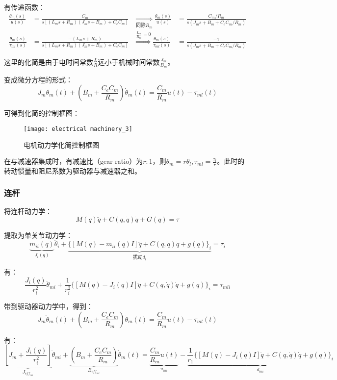 \documentclass[
12pt, %
a4paper, 
oneside, %
headinclude,footinclude, %
]{scrartcl}
\begin{document}
有传递函数：
\begin{align*}
\frac{\theta_m(s)}{u(s)} &= \frac{C_m}{s[(L_m s + R_m)(J_m s + B_m) + C_e C_m]}& \underset{\text{同除}R_m}{\Longrightarrow} \frac{\theta_m(s)}{u(s)} &= \frac{C_m/R_m}{s(J_m s + B_m + C_e C_m/R_m)} \\
\frac{\theta_m(s)}{\tau_{ml}(s)} &= \frac{-(L_m s + R_m)}{s[(L_m s + R_m)(J_m s + B_m) + C_e C_m]}& \overset{\frac{L_m}{R_m} = 0}{\Longrightarrow} \frac{\theta_m(s)}{\tau_{ml}(s)} &= \frac{-1}{s(J_m s + B_m + C_e C_m/R_m)}
\end{align*}

这里的化简是由于电时间常数$ \frac{L}{R} $远小于机械时间常数$ \frac{J_m}{B_m} $。

变成微分方程的形式：
$$ J_m \ddot{\theta}_m(t) + (B_m + \frac{C_e C_m}{R_m}) \dot{\theta}_m(t) = \frac{C_m}{R_m} u(t) - \tau_{ml}(t) $$

可得到化简的控制框图：
\begin{figure}[H]
\centering 
\texttt{[image: electrical machinery\_3]} 
\caption[电机动力学化简控制框图]{电机动力学化简控制框图}
\end{figure}

在与减速器集成时，有减速比（gear ratio）为$ r:1 $，则$ \theta_m = r \theta_l, \tau_{ml} = \frac{\tau_l}{r} $。此时的转动惯量和阻尼系数为驱动器与减速器之和。
\subsubsection[连杆]{连杆}
将连杆动力学：
$$ M(q)\ddot{q} + C(q, \dot{q})\dot{q} + G(q) = \tau $$

提取为单关节动力学：
$$ \underbrace{m_{ii}(q)}_{J_i(q)}\ddot{\theta}_i + \underbrace{\{[M(q) - m_{ii}(q)I]\ddot{q} + C(q, \dot{q})\dot{q} + g(q)\}_i}_{\text{扰动}d_i} = \tau_i $$

有：
$$ \frac{J_i(q)}{r_i^2}\ddot{\theta}_{mi} + \frac{1}{r_i^2}\{[M(q) - J_i(q)I]\ddot{q} + C(q, \dot{q})\dot{q} + g(q)\}_i = \tau_{mli} $$

带到驱动器动力学中，得到：
$$ J_m\ddot{\theta}_m(t) + (B_m + \frac{C_e C_m}{R_m})\dot{\theta}_m(t) = \frac{C_m}{R_m}u(t) - \tau_{ml}(t) $$

有：
$$ \underbrace{[J_m + \frac{J_i(q)}{r_i^2}]}_{J_{eff_{mi}}}\ddot{\theta}_{mi} + \underbrace{(B_m + \frac{C_e C_m}{R_m})}_{B_{eff_{mi}}}\dot{\theta}_m(t) = \underbrace{\frac{C_m}{R_m}u(t)}_{u_{mi}} - \underbrace{\frac{1}{r_1}\{[M(q) - J_i(q)I]\ddot{q} + C(q, \dot{q})\dot{q} + g(q)\}_i}_{d_{mi}} $$
\end{document}

